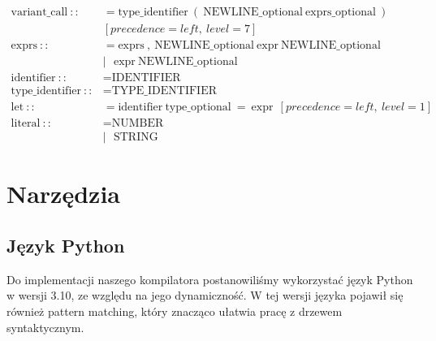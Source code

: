 \documentclass[a4paper,12pt]{book} %
\begin{document}
\begin{align*}
  \text{variant\_call}\ ::            & = \text{type\_identifier}\ (\ \text{NEWLINE\_optional}\ \text{exprs\_optional}\ ) \\ & [precedence=left,\ level=7]                                                                                                          \\
  \text{exprs}\ ::                    & = \text{exprs}\ ,\ \text{NEWLINE\_optional}\ \text{expr}\ \text{NEWLINE\_optional}                                                                                                                                        \\
                                      & |\ \ \ \text{expr}\ \text{NEWLINE\_optional}                                                                                                                                                                              \\
  \text{identifier}\ ::               & = \text{IDENTIFIER}                                                                                                                                                                                                       \\
  \text{type\_identifier}\ ::         & = \text{TYPE\_IDENTIFIER}                                                                                                                                                                                                 \\
  \text{let}\ ::                      & = \text{identifier}\ \text{type\_optional}\ =\ \text{expr}\ \ [precedence=left,\ level=1]                                                                                                                                 \\
  \text{literal}\ ::                  & = \text{NUMBER}                                                                                                                                                                                                           \\
                                      & |\ \ \ \text{STRING}
\end{align*}
\chapter{Narzędzia}
\section{Język Python}
Do implementacji naszego kompilatora postanowiliśmy wykorzystać język Python w wersji 3.10, ze względu na jego dynamiczność.
W tej wersji języka pojawił się również pattern matching, który znacząco ułatwia pracę z drzewem syntaktycznym.
\end{document}
